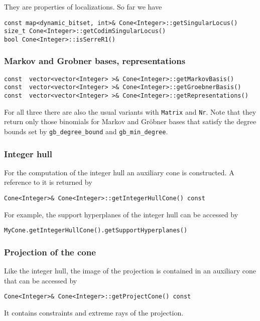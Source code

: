 \begin{small}
They are properties of localizations. So far we have
\begin{Verbatim}
const map<dynamic_bitset, int>& Cone<Integer>::getSingularLocus()
size_t Cone<Integer>::getCodimSingularLocus()
bool Cone<Integer>::isSerreR1()
\end{Verbatim}

\subsubsection{Markov and Grobner bases, representations}
\begin{Verbatim}
const  vector<vector<Integer> >& Cone<Integer>::getMarkovBasis()
const  vector<vector<Integer> >& Cone<Integer>::getGroebnerBasis()
const  vector<vector<Integer> >& Cone<Integer>::getRepresentations()
\end{Verbatim}
For all three there are also the usual variants with \verb|Matrix| and \verb|Nr|.
Note that they return only those binomials for Markov and Gröbner bases that satisfy the degree bounds set by \verb|gb_degree_bound| and \verb|gb_min_degree|.


\subsubsection{Integer hull}

For the computation of the integer hull an auxiliary cone is constructed. A reference to it is returned by
\begin{Verbatim}
Cone<Integer>& Cone<Integer>::getIntegerHullCone() const
\end{Verbatim}

For example, the support hyperplanes of the integer hull can be accessed by
\begin{Verbatim}
MyCone.getIntegerHullCone().getSupportHyperplanes()
\end{Verbatim}

\subsubsection{Projection of the cone}

Like the integer hull, the image of the projection is contained in an auxiliary cone that can be accessed by
\begin{Verbatim}
Cone<Integer>& Cone<Integer>::getProjectCone() const
\end{Verbatim}

It contains constraints and extreme rays of the projection.


\end{small}
